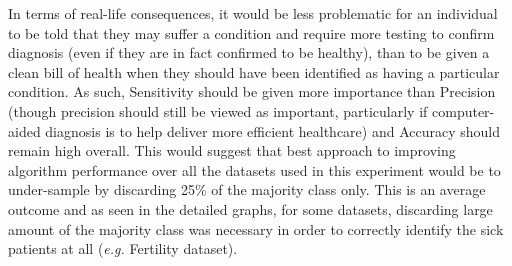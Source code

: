 In terms of real-life consequences, it would be less problematic for an individual to be told that they may suffer a condition and require more testing to confirm diagnosis (even if they are in fact confirmed to be healthy), than to be given a clean bill of health when they should have been identified as having a particular condition. As such, Sensitivity should be given more importance than Precision (though precision should still be viewed as important, particularly if computer-aided diagnosis is to help deliver more efficient healthcare) and Accuracy should remain high overall. This would suggest that best approach to improving algorithm performance over all the datasets used in this experiment would be to under-sample by discarding 25\% of the majority class only. This is an average outcome and as seen in the detailed graphs, for some datasets, discarding large amount of the majority class was necessary in order to correctly identify the sick patients at all (\textit{e.g.} Fertility dataset).\newline

